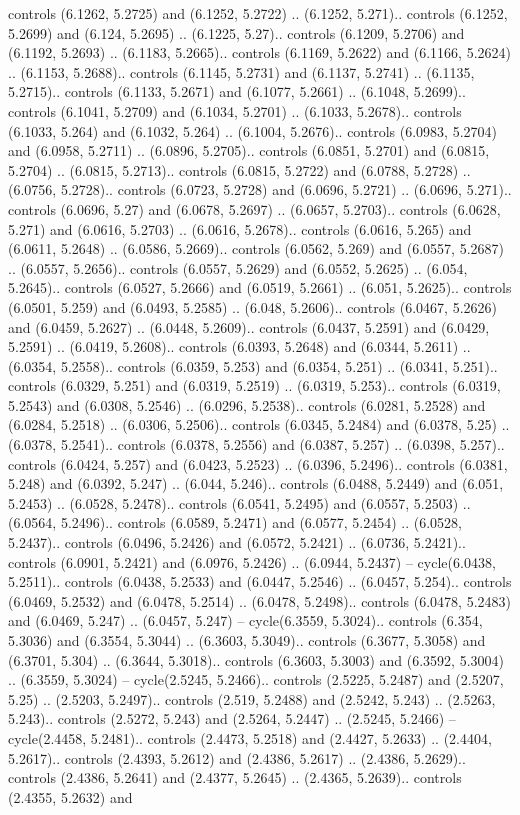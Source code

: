controls (6.1262, 5.2725) and (6.1252, 5.2722) .. (6.1252, 5.271).. controls (6.1252, 5.2699) and (6.124, 5.2695) .. (6.1225, 5.27).. controls (6.1209, 5.2706) and (6.1192, 5.2693) .. (6.1183, 5.2665).. controls (6.1169, 5.2622) and (6.1166, 5.2624) .. (6.1153, 5.2688).. controls (6.1145, 5.2731) and (6.1137, 5.2741) .. (6.1135, 5.2715).. controls (6.1133, 5.2671) and (6.1077, 5.2661) .. (6.1048, 5.2699).. controls (6.1041, 5.2709) and (6.1034, 5.2701) .. (6.1033, 5.2678).. controls (6.1033, 5.264) and (6.1032, 5.264) .. (6.1004, 5.2676).. controls (6.0983, 5.2704) and (6.0958, 5.2711) .. (6.0896, 5.2705).. controls (6.0851, 5.2701) and (6.0815, 5.2704) .. (6.0815, 5.2713).. controls (6.0815, 5.2722) and (6.0788, 5.2728) .. (6.0756, 5.2728).. controls (6.0723, 5.2728) and (6.0696, 5.2721) .. (6.0696, 5.271).. controls (6.0696, 5.27) and (6.0678, 5.2697) .. (6.0657, 5.2703).. controls (6.0628, 5.271) and (6.0616, 5.2703) .. (6.0616, 5.2678).. controls (6.0616, 5.265) and (6.0611, 5.2648) .. (6.0586, 5.2669).. controls (6.0562, 5.269) and (6.0557, 5.2687) .. (6.0557, 5.2656).. controls (6.0557, 5.2629) and (6.0552, 5.2625) .. (6.054, 5.2645).. controls (6.0527, 5.2666) and (6.0519, 5.2661) .. (6.051, 5.2625).. controls (6.0501, 5.259) and (6.0493, 5.2585) .. (6.048, 5.2606).. controls (6.0467, 5.2626) and (6.0459, 5.2627) .. (6.0448, 5.2609).. controls (6.0437, 5.2591) and (6.0429, 5.2591) .. (6.0419, 5.2608).. controls (6.0393, 5.2648) and (6.0344, 5.2611) .. (6.0354, 5.2558).. controls (6.0359, 5.253) and (6.0354, 5.251) .. (6.0341, 5.251).. controls (6.0329, 5.251) and (6.0319, 5.2519) .. (6.0319, 5.253).. controls (6.0319, 5.2543) and (6.0308, 5.2546) .. (6.0296, 5.2538).. controls (6.0281, 5.2528) and (6.0284, 5.2518) .. (6.0306, 5.2506).. controls (6.0345, 5.2484) and (6.0378, 5.25) .. (6.0378, 5.2541).. controls (6.0378, 5.2556) and (6.0387, 5.257) .. (6.0398, 5.257).. controls (6.0424, 5.257) and (6.0423, 5.2523) .. (6.0396, 5.2496).. controls (6.0381, 5.248) and (6.0392, 5.247) .. (6.044, 5.246).. controls (6.0488, 5.2449) and (6.051, 5.2453) .. (6.0528, 5.2478).. controls (6.0541, 5.2495) and (6.0557, 5.2503) .. (6.0564, 5.2496).. controls (6.0589, 5.2471) and (6.0577, 5.2454) .. (6.0528, 5.2437).. controls (6.0496, 5.2426) and (6.0572, 5.2421) .. (6.0736, 5.2421).. controls (6.0901, 5.2421) and (6.0976, 5.2426) .. (6.0944, 5.2437) -- cycle(6.0438, 5.2511).. controls (6.0438, 5.2533) and (6.0447, 5.2546) .. (6.0457, 5.254).. controls (6.0469, 5.2532) and (6.0478, 5.2514) .. (6.0478, 5.2498).. controls (6.0478, 5.2483) and (6.0469, 5.247) .. (6.0457, 5.247) -- cycle(6.3559, 5.3024).. controls (6.354, 5.3036) and (6.3554, 5.3044) .. (6.3603, 5.3049).. controls (6.3677, 5.3058) and (6.3701, 5.304) .. (6.3644, 5.3018).. controls (6.3603, 5.3003) and (6.3592, 5.3004) .. (6.3559, 5.3024) -- cycle(2.5245, 5.2466).. controls (2.5225, 5.2487) and (2.5207, 5.25) .. (2.5203, 5.2497).. controls (2.519, 5.2488) and (2.5242, 5.243) .. (2.5263, 5.243).. controls (2.5272, 5.243) and (2.5264, 5.2447) .. (2.5245, 5.2466) -- cycle(2.4458, 5.2481).. controls (2.4473, 5.2518) and (2.4427, 5.2633) .. (2.4404, 5.2617).. controls (2.4393, 5.2612) and (2.4386, 5.2617) .. (2.4386, 5.2629).. controls (2.4386, 5.2641) and (2.4377, 5.2645) .. (2.4365, 5.2639).. controls (2.4355, 5.2632) and 
